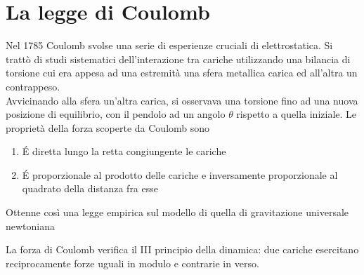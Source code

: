 \section{La legge di Coulomb}
Nel 1785 Coulomb svolse una serie di esperienze cruciali di elettrostatica. Si trattò di studi sistematici dell'interazione tra cariche utilizzando una bilancia di torsione cui era appesa ad una estremità una sfera metallica carica ed all'altra un contrappeso.
\\Avvicinando alla sfera un'altra carica, si osservava una torsione fino ad una nuova posizione di equilibrio, con il pendolo ad un angolo $\theta$ rispetto a quella iniziale.
Le proprietà della forza scoperte da Coulomb sono
\begin{enumerate}
\item \'E diretta lungo la retta congiungente le cariche
\item \'E proporzionale al prodotto delle cariche e inversamente proporzionale al quadrato della distanza fra esse
\end{enumerate}
Ottenne così una legge empirica sul modello di quella di gravitazione universale newtoniana


La forza di Coulomb verifica il III principio della dinamica: due cariche esercitano reciprocamente forze uguali in modulo e contrarie in verso.

